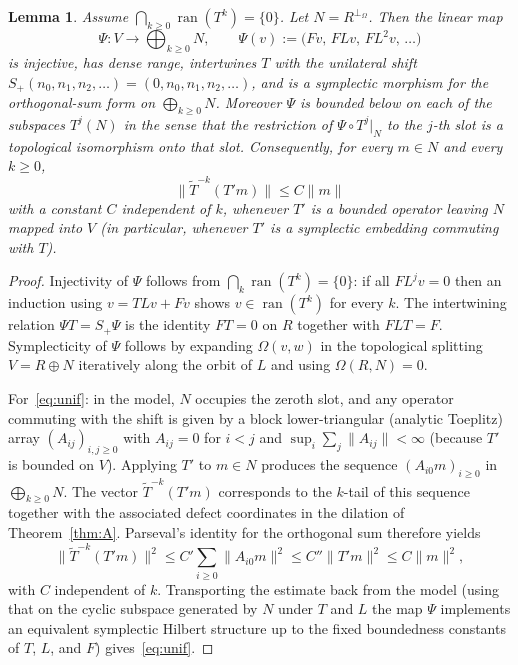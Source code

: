 \documentclass[11pt,a4paper]{article}
\newtheorem{lemma}[theorem]{Lemma}
\theoremstyle{definition}
\begin{document}
\begin{lemma}
\label{lem:shift-model}
Assume \(\bigcap_{k\ge 0}\operatorname{ran}(T^k)=\{0\}\). Let \(N=R^{\perp_\Omega}\). Then the linear map
\begin{equation}
\label{eq:Psi}
\Psi:V\to\bigoplus_{k\ge 0}N,
\qquad
\Psi(v):=\bigl(Fv,\,FLv,\,FL^2v,\,\dots\bigr)
\end{equation}
is injective, has dense range, intertwines \(T\) with the unilateral shift
\(S_+(n_0,n_1,n_2,\dots)=(0,n_0,n_1,n_2,\dots)\), and is a symplectic morphism for the orthogonal-sum
form on \(\bigoplus_{k\ge 0}N\). Moreover \(\Psi\) is bounded below on each of the subspaces
\(T^j(N)\) in the sense that the restriction of \(\Psi\circ T^j|_N\) to the \(j\)-th slot is a
topological isomorphism onto that slot. Consequently, for every \(m\in N\) and every \(k\ge 0\),
\begin{equation}
\label{eq:unif}
\|\widetilde{T}^{-k}(T'm)\|\le C\|m\|
\end{equation}
with a constant \(C\) independent of \(k\), whenever \(T'\) is a bounded operator leaving \(N\) mapped
into \(V\) (in particular, whenever \(T'\) is a symplectic embedding commuting with \(T\)).
\end{lemma}

\begin{proof}
Injectivity of \(\Psi\) follows from \(\bigcap_k\operatorname{ran}(T^k)=\{0\}\): if all
\(FL^jv=0\) then an induction using \(v=TLv+Fv\) shows \(v\in\operatorname{ran}(T^k)\) for every
\(k\). The intertwining relation \(\Psi T=S_+\Psi\) is the identity \(F T=0\) on \(R\) together with
\(FLT=F\). Symplecticity of \(\Psi\) follows by expanding \(\Omega(v,w)\) in the topological
splitting \(V=R\oplus N\) iteratively along the orbit of \(L\) and using \(\Omega(R,N)=0\).

For~\eqref{eq:unif}: in the model, \(N\) occupies the zeroth slot, and any operator commuting with
the shift is given by a block lower-triangular (analytic Toeplitz) array
\((A_{ij})_{i,j\ge 0}\) with \(A_{ij}=0\) for \(i<j\) and \(\sup_i\sum_j\|A_{ij}\|<\infty\)
(because \(T'\) is bounded on \(V\)). Applying \(T'\) to \(m\in N\) produces the sequence
\((A_{i0}m)_{i\ge 0}\) in \(\bigoplus_{k\ge 0}N\). The vector \(\widetilde{T}^{-k}(T'm)\) corresponds
to the \(k\)-tail of this sequence together with the associated defect coordinates in the dilation
of Theorem~\ref{thm:A}. Parseval's identity for the orthogonal sum therefore yields
\[
\|\widetilde{T}^{-k}(T'm)\|^2
\le C'\sum_{i\ge 0}\|A_{i0}m\|^2
\le C''\|T'm\|^2
\le C\|m\|^2,
\]
with \(C\) independent of \(k\). Transporting the estimate back from the model (using that on the
cyclic subspace generated by \(N\) under \(T\) and \(L\) the map \(\Psi\) implements an equivalent
symplectic Hilbert structure up to the fixed boundedness constants of \(T\), \(L\), and \(F\))
gives~\eqref{eq:unif}.
\end{proof}
\end{document}
